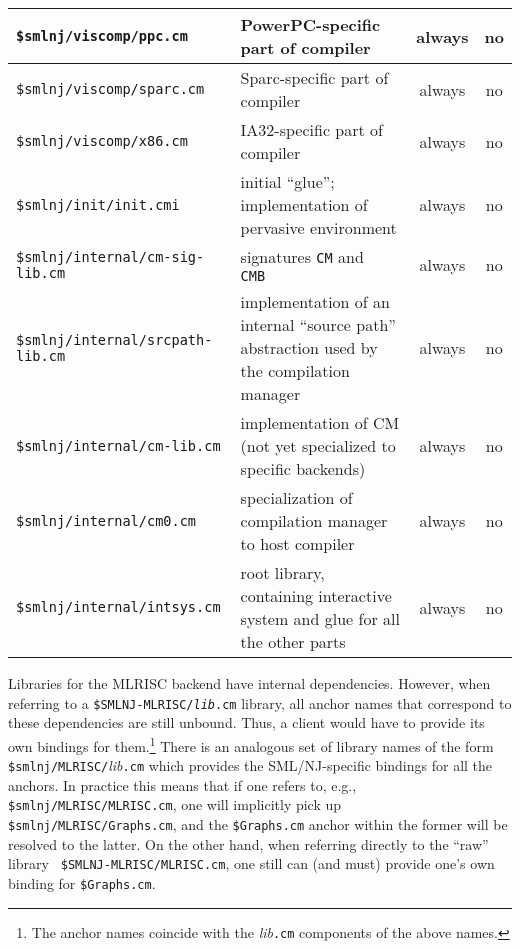 \begin{small}
\begin{center}
\begin{tabular}{p{2.5in}||p{2.6in}|c|c}
\hline
{\tt \$smlnj/viscomp/ppc.cm} & PowerPC-specific part of compiler &
always & no \\
\hline
{\tt \$smlnj/viscomp/sparc.cm} & Sparc-specific part of compiler &
always & no \\
\hline
{\tt \$smlnj/viscomp/x86.cm} & IA32-specific part of compiler & always
& no \\
\hline \hline
{\tt \$smlnj/init/init.cmi} & initial ``glue''; implementation of
pervasive environment & always & no \\
\hline \hline
{\tt \$smlnj/internal/cm-sig-lib.cm} & signatures {\tt CM} and {\tt
CMB} & always & no \\
\hline
{\tt \$smlnj/internal/srcpath-lib.cm} & implementation of an internal
``source path'' abstraction used by the compilation manager & always &
no \\
\hline
{\tt \$smlnj/internal/cm-lib.cm} & implementation of CM
(not yet specialized to specific backends) & always & no \\
\hline
{\tt \$smlnj/internal/cm0.cm} & specialization of compilation manager
to host compiler & always &
no \\
\hline
{\tt \$smlnj/internal/intsys.cm} & root library, containing
interactive system and glue for all the other parts & always &
no
\end{tabular}
\end{center}
\end{small}

Libraries for the MLRISC backend have internal dependencies.  However,
when referring to a {\tt \$SMLNJ-MLRISC/{\it lib}.cm} library, all
anchor names that correspond to these dependencies are still unbound.
Thus, a client would have to provide its own bindings for
them.\footnote{The anchor names coincide with the {\it lib}{\tt .cm}
components of the above names.} There is an analogous set of library
names of the form {\tt \$smlnj/MLRISC/}{\it lib}{\tt .cm} which
provides the SML/NJ-specific bindings for all the anchors.  In
practice this means that if one refers to, e.g., {\tt
\$smlnj/MLRISC/MLRISC.cm}, one will implicitly pick up {\tt
\$smlnj/MLRISC/Graphs.cm}, and the {\tt \$Graphs.cm} anchor within the
former will be resolved to the latter.  On the other hand, when
referring directly to the ``raw'' library {\tt
\$SMLNJ-MLRISC/MLRISC.cm}, one still can (and must) provide one's own
binding for {\tt \$Graphs.cm}.
